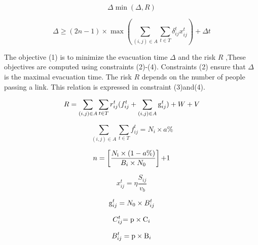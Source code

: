 \documentclass{mcmthesis}	%
\begin{document}
\begin{equation}\label{3}
\Delta \min (\Delta ,R)
\end{equation}

\begin{equation}\label{4}
\Delta  \ge (2n - 1) \times \max (\sum\limits_{(i,j) \in A} {\sum\limits_{t \in T} {\delta _{ij}^tx_{ij}^t} } ) + \Delta t
\end{equation}

The objective (1) is to minimize the evacuation time $\Delta $ and the risk $R$ ,These objectives are computed using constraints (2)-(4). Constraints (2) ensure that $\Delta $ is the maximal evacuation time. The risk $R$ depends on the number of people passing a link. This relation is expressed in constraint (3)and(4).

\begin{equation}\label{5}
 R = \sum\limits_{(i,j) \in A} {\sum\limits_{t \in T} {r_{ij}^t} } (f_{ij}^t + \sum\limits_{(i,j) \in A} {{\rm{g}}_{ij}^t} ) + W + V
\end{equation}

\begin{equation}\label{6}
\sum\limits_{(i,j) \in A} {\sum\limits_{t \in T} {f_{ij}^t} }  = {N_i} \times a\%
\end{equation}

\begin{equation}\label{7}
n = \left[ {\frac{{{N_{\rm{i}}} \times (1 - a\% )}}{{{B_i} \times {N_0}}}} \right]{\rm{ + }}1
\end{equation}

\begin{equation}\label{8}
x_{ij}^t = \eta \frac{{{S_{ij}}}}{{{v_b}}}
\end{equation}

\begin{equation}\label{9}
{\rm{g}}_{ij}^t = {N_0} \times B_{ij}^t
\end{equation}

\begin{equation}\label{10}
C_{ij}^t{\rm{ = p}} \times {{\rm{C}}_i}
\end{equation}


\begin{equation}\label{11}
B_{ij}^t = {\rm{p}} \times {{\rm{B}}_i}
\end{equation}
\end{document}
